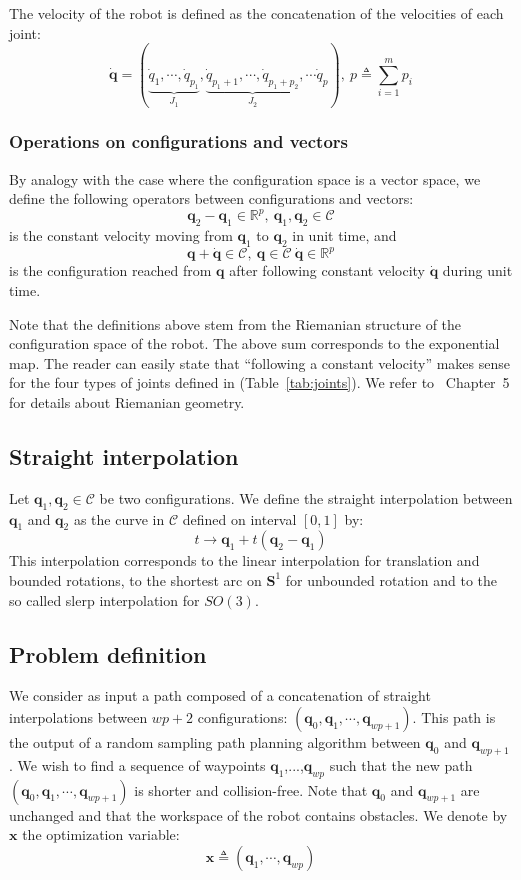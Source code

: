 \documentclass{tADR2e}
\newcommand\real{\mathbb{R}}
\newcommand\CS{\mathcal{C}}
\newcommand\Sone{\mathbf{S}^1}
\newcommand\conf{\mathbf{q}}
\newcommand\xx{\mathbf{x}} %
\begin{document}
The velocity of the robot is defined as the concatenation of the velocities of 
each joint:
$$\dot{\conf} = (\underbrace{\dot{q}_{1},\cdots,\dot{q}_{p_1}}_{J_1},
\underbrace{\dot{q}_{p_1+1},\cdots,\dot{q}_{p_1+p_2}}_{J_2},\cdots \dot{q}_p),\ p
\triangleq\sum_{i=1}^m p_i$$

\subsubsection{Operations on configurations and vectors}%
By analogy with the case 
where the configuration space is a vector space, we define the following 
operators between configurations and vectors:
$$
\conf_2 - \conf_1 \in \real^p, \ \conf_1, \conf_2\in\CS
$$
is the constant velocity moving from $\conf_1$ to $\conf_2$ in unit time, and
$$
\conf + \dot{\conf}\in\CS, \ \conf\in\CS \ \dot{\conf}\in\real^p
$$
is the configuration reached from $\conf$ after following constant velocity $
\dot{\conf}$ during unit time.

Note that the definitions above stem from the Riemanian structure of the 
configuration space of the robot. The above sum corresponds to the exponential 
map. The reader can easily state that ``following a 
constant velocity'' makes sense for the four types of joints defined in 
(Table~\ref{tab:joints}). We refer to~\cite{riemanian-optim2008} Chapter~5 for 
details about Riemanian geometry.

\subsection {Straight interpolation}

Let $\conf_1, \conf_2\in\CS$ be two configurations. We define the straight 
interpolation between $\conf_1$ and $\conf_2$ as the curve in $\CS$ defined on 
interval $[0,1]$ by:
$$
t \rightarrow \conf_1 + t (\conf_2 - \conf_1)
$$
This interpolation corresponds to the linear interpolation for translation and 
bounded rotations, to the shortest arc on $\Sone$ for unbounded rotation and to 
the so called slerp interpolation for $SO(3)$.

\subsection{Problem definition}

We consider as input a path composed of a concatenation of straight 
interpolations between $wp+2$ configurations: $(\conf_0, \conf_1,\cdots,\conf_{wp
+1})$. This path is the output of a random sampling path planning algorithm 
between $\conf_0$ and $\conf_{wp+1}$. We wish to find a sequence of waypoints $
\conf_{1}$,...,$\conf_{wp}$ such that the new path $(\conf_0, \conf_1,\cdots,
\conf_{wp+1})$ is shorter and collision-free. Note that $\conf_0$ and $\conf_{wp
+1}$ are unchanged and that the workspace of the robot contains obstacles. We 
denote by $\xx$ the optimization variable:
$$
\xx \triangleq (\conf_1,\cdots,\conf_{wp})
$$
\end{document}
